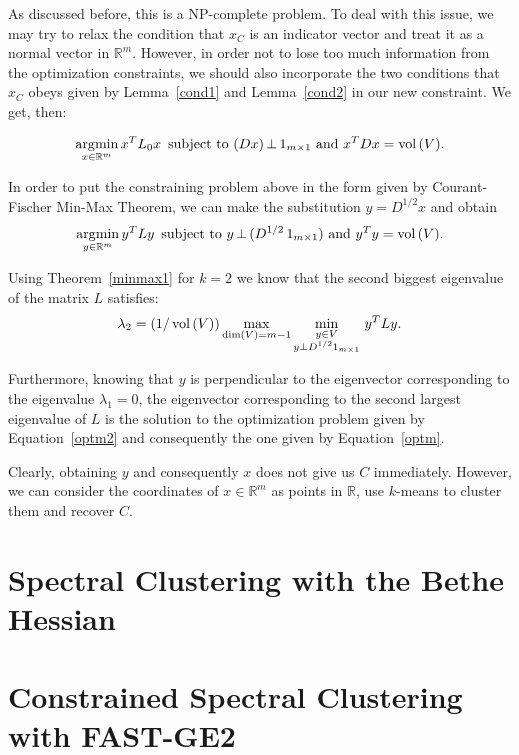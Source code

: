 As discussed before, this is a NP-complete problem.
To deal with this issue, we may try to relax the condition that $x_C$ is an indicator vector and treat it as a normal vector in $\mathbb R^{m }$.
However, in order not to lose too much information from the optimization constraints, we should also incorporate the two conditions that $x_C$ obeys given by Lemma~\ref{cond1} and Lemma~\vref{cond2} in our new constraint. We get, then:

\begin{equation}
   \operatorname*{\arg\!\min}_{x \in \mathbb R^{m }} {x}^TL_0{x}\,\text{ subject to } (Dx)\, \bot \, 1_{m \times 1}  \text{ and } x^T D x = \operatorname*{vol\,} (V).
\end{equation}

In order to put the constraining problem above in the form given by Courant-Fischer Min-Max Theorem, we can make the substitution $y = D^{1/2}x$ and obtain
\begin{equation} \label{optm}
   \operatorname*{\arg\!\min}_{y \in \mathbb R^{m }} y^TLy \,\text{ subject to } y \, \bot \, (D^{1/2} \,1_{m \times 1}) \text{ and } y^T y = \operatorname*{vol\,} (V).
\end{equation}

Using Theorem~\vref{minmax1} for $k = 2$ we know that the second biggest eigenvalue of the matrix $L$ satisfies:
\begin{equation}\label{optm2}
   \lambda_2 = \left( 1/\operatorname*{vol\,}(V) \right) \max_{\dim (V) = m-1} \min_{\substack{y \in V \\ y \bot D^{1/2}1_{m \times 1}}} \, y^TLy.
\end{equation}

Furthermore, knowing that $y$ is perpendicular to the eigenvector corresponding to the eigenvalue $\lambda_1 = 0$, the eigenvector corresponding to the second largest eigenvalue of $L$ is the solution to the optimization problem given by Equation~\ref{optm2} and consequently the one given by Equation~\ref{optm}.

Clearly, obtaining $y$ and consequently $x$ does not give us $C$ immediately.
However, we can consider the coordinates of $x \in \mathbb R^{m }$ as points in $\mathbb R$, use $k$-means to cluster them and recover $C$.

\chapter{Spectral Clustering with the Bethe Hessian}


\chapter{Constrained Spectral Clustering with FAST-GE2}



